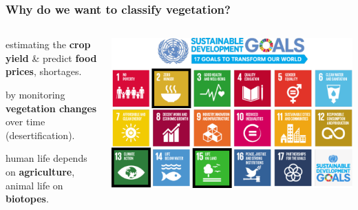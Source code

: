 \documentclass[11pt]{beamer}
\begin{document}
	\begin{frame}
		\frametitle{Why do we want to classify vegetation?}
		\begin{columns}
			{\scriptsize
			\begin{description}
				\item[Zero Hunger] estimating the \textbf{crop yield} \& predict \textbf{food prices}, shortages.
				\item<2->[Climate Action] by monitoring \textbf{vegetation changes} over time (desertification).
				\item<3->[Life on Land] human life depends on \textbf{agriculture}, animal life on \textbf{biotopes}.
			\end{description}
			}
			\includegraphics[width=\textwidth]{images/sdg_goals.pdf}
		\end{columns}
		
	\end{frame}
\end{document}
